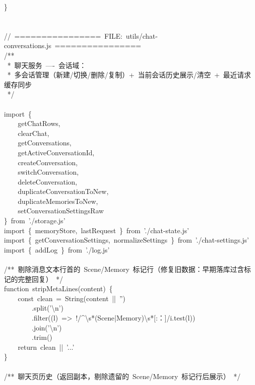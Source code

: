 \documentclass[a4paper,10pt]{article}
\begin{document}
{\ttfamily\footnotesize\raggedright
\}\\
\mbox{}\\
\mbox{}\\
//~================~FILE:~utils/chat-conversations.js~================\\
/**\\
~*~聊天服务~----~会话域：\\
~*~多会话管理（新建/切换/删除/复制）+~当前会话历史展示/清空~+~最近请求缓存同步\\
~*/\\
\mbox{}\\
import~\{\\
~~~~getChatRows,\\
~~~~clearChat,\\
~~~~getConversations,\\
~~~~getActiveConversationId,\\
~~~~createConversation,\\
~~~~switchConversation,\\
~~~~deleteConversation,\\
~~~~duplicateConversationToNew,\\
~~~~duplicateMemoriesToNew,\\
~~~~setConversationSettingsRaw\\
\}~from~'./storage.js'\\
import~\{~memoryStore,~lastRequest~\}~from~'./chat-state.js'\\
import~\{~getConversationSettings,~normalizeSettings~\}~from~'./chat-settings.js'\\
import~\{~addLog~\}~from~'./log.js'\\
\mbox{}\\
/**~剔除消息文本行首的~Scene/Memory~标记行（修复旧数据：早期落库过含标记的完整回复）~*/\\
function~stripMetaLines(content)~\{\\
~~~~const~clean~=~String(content~||~'')\\
~~~~~~~~.split('\textbackslash{}n')\\
~~~~~~~~.filter((l)~=>~!/\textasciicircum{}\textbackslash{}s*(Scene|Memory)\textbackslash{}s*[:：]/i.test(l))\\
~~~~~~~~.join('\textbackslash{}n')\\
~~~~~~~~.trim()\\
~~~~return~clean~||~'...'\\
\}\\
\mbox{}\\
/**~聊天页历史（返回副本，剔除遗留的~Scene/Memory~标记行后展示）~*/\\
}
\end{document}
